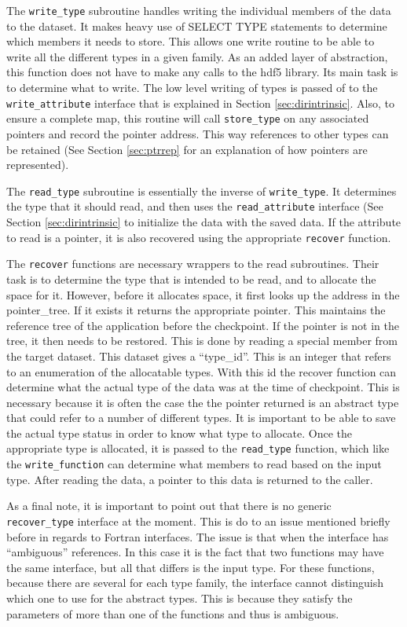 \documentclass{article}
\begin{document}
The \texttt{write\_type} subroutine handles writing the individual members of the data to the dataset. It makes heavy use of SELECT TYPE statements to determine which members it needs to store. This allows one write routine to be able to write all the different types in a given family. As an added layer of abstraction, this function does not have to make any calls to the hdf5 library. Its main task is to determine what to write. The low level writing of types is passed of to the \texttt{write\_attribute} interface that is explained in Section \ref{sec:dirintrinsic}. Also, to ensure a complete map, this routine will call \texttt{store\_type} on any associated pointers and record the pointer address. This way references to other types can be retained (See Section \ref{sec:ptrrep} for an explanation of how pointers are represented).

The \texttt{read\_type} subroutine is essentially the inverse of \texttt{write\_type}. It determines the type that it should read, and then uses the \texttt{read\_attribute} interface (See Section \ref{sec:dirintrinsic} to initialize the data with the saved data. If the attribute to read is a pointer, it is also recovered using the appropriate \texttt{recover} function.

The \texttt{recover} functions are necessary wrappers to the read subroutines. Their task is to determine the type that is intended to be read, and to allocate the space for it. However, before it allocates space, it first looks up the address in the pointer\_tree. If it exists it returns the appropriate pointer. This maintains the reference tree of the application before the checkpoint. If the pointer is not in the tree, it then needs to be restored. This is done by reading a special member from the target dataset. This dataset gives a ``type\_id''. This is an integer that refers to an enumeration of the allocatable types. With this id the recover function can determine what the actual type of the data was at the time of checkpoint. This is necessary because it is often the case the the pointer returned is an abstract type that could refer to a number of different types. It is important to be able to save the actual type status in order to know what type to allocate. Once the appropriate type is allocated, it is passed to the \texttt{read\_type} function, which like the \texttt{write\_function} can determine what members to read based on the input type. After reading the data, a pointer to this data is returned to the caller.

As a final note, it is important to point out that there is no generic \texttt{recover\_type} interface at the moment. This is do to an issue mentioned briefly before in regards to Fortran interfaces. The issue is that when the interface has ``ambiguous'' references. In this case it is the fact that two functions may have the same interface, but all that differs is the input type. For these functions, because there are several for each type family, the interface cannot distinguish which one to use for the abstract types. This is because they satisfy the parameters of more than one of the functions and thus is ambiguous.
\end{document}
